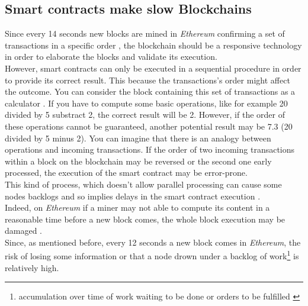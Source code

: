 \subsection{Smart contracts make slow Blockchains}
Since every 14 seconds new blocks are mined in \textit{Ethereum} \cite{sina} confirming a set of transactions in a specific order \cite{challenge3}, the blockchain should be a responsive technology in order to elaborate the blocks and validate its execution. \\
However, smart contracts can only be executed in a sequential procedure \cite{challenge3} in order to provide its correct result. This because the transactions's order might affect the outcome. You can consider the block containing this set of transactions as a calculator \cite{challenge1}. If you have to compute some basic operations, like for example 20 divided by 5 substract 2, the correct result will be 2. However, if the order of these operations cannot be guaranteed, another potential result may be 7.3 (20 divided by 5 minus 2). 
You can imagine that there is an analogy between operations and incoming transactions. If the order of two incoming transactions within a block on the blockchain may be reversed or the second one early processed, the execution of the smart contract may be error-prone. \\
This kind of process, which doesn't allow parallel processing can cause some nodes backlogs and so implies delays in the smart contract execution \cite{challenge1}. \\
Indeed, on \textit{Ethereum} if a miner may not able to compute its content in a reasonable time before a new block comes, the whole block execution may be damaged \cite{challenge1}. \\
Since, as mentioned before, every 12 seconds a new block comes in \textit{Ethereum}, the risk of losing some information or that a node drown under a backlog of work\footnote{accumulation over time of work waiting to be done or orders to be fulfilled \cite{challenge4}} is relatively high.



